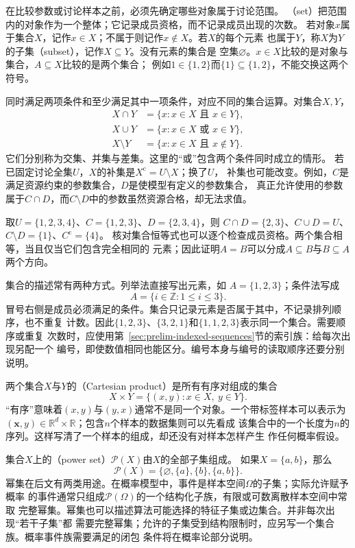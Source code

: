 在比较参数或讨论样本之前，必须先确定哪些对象属于讨论范围。
（set）把范围内的对象作为一个整体；它记录成员资格，而不记录成员出现的次数。
若对象$x$属于集合$X$，记作$x\in X$；不属于则记作$x\notin X$。若$X$的每个元素
也属于$Y$，称$X$为$Y$的子集（subset），记作$X\subseteq Y$。没有元素的集合是
空集$\varnothing$。$x\in X$比较的是对象与集合，$A\subseteq X$比较的是两个集合；
例如$1\in\{1,2\}$而$\{1\}\subseteq\{1,2\}$，不能交换这两个符号。

同时满足两项条件和至少满足其中一项条件，对应不同的集合运算。对集合$X,Y$，
\[
  \begin{aligned}
    X\cap Y&=\{x:x\in X\text{ 且 }x\in Y\},\\
    X\cup Y&=\{x:x\in X\text{ 或 }x\in Y\},\\
    X\setminus Y&=\{x:x\in X\text{ 且 }x\notin Y\}.
  \end{aligned}
\]
它们分别称为交集、并集与差集。这里的“或”包含两个条件同时成立的情形。
若已固定讨论全集$U$，$X$的补集是$X^{\mathrm c}=U\setminus X$；换了$U$，
补集也可能改变。例如，$C$是满足资源约束的参数集合，$D$是使模型有定义的参数集合，
真正允许使用的参数属于$C\cap D$，而$C\setminus D$中的参数虽然资源合格，却无法求值。

取$U=\{1,2,3,4\}$、$C=\{1,2,3\}$、$D=\{2,3,4\}$，则
$C\cap D=\{2,3\}$、$C\cup D=U$、$C\setminus D=\{1\}$、$C^{\mathrm c}=\{4\}$。
核对集合恒等式也可以逐个检查成员资格。两个集合相等，当且仅当它们包含完全相同的
元素；因此证明$A=B$可以分成$A\subseteq B$与$B\subseteq A$两个方向。

集合的描述常有两种方式。列举法直接写出元素，如
$A=\{1,2,3\}$；条件法写成
\[
  A=\{i\in\mathbb{Z}:1\leq i\leq 3\}.
\]
冒号右侧是成员必须满足的条件。集合只记录元素是否属于其中，不记录排列顺序，也不重复
计数。因此$\{1,2,3\}$、$\{3,2,1\}$和$\{1,1,2,3\}$表示同一个集合。需要顺序或重复
次数时，应使用第~\ref{sec:prelim-indexed-sequences}节的索引族：给每次出现另配一个
编号，即使数值相同也能区分。编号本身与编号的读取顺序还要分别说明。

两个集合$X$与$Y$的（Cartesian product）是所有有序对组成的集合
\[
  X\times Y=\{(x,y):x\in X,\ y\in Y\}.
\]
“有序”意味着$(x,y)$与$(y,x)$通常不是同一个对象。一个带标签样本可以表示为
$(\bm{x},y)\in\mathbb{R}^d\times\mathbb{R}$；包含$n$个样本的数据集则可以先看成
该集合中的一个长度为$n$的序列。这样写清了一个样本的组成，却还没有对样本怎样产生
作任何概率假设。

集合$X$上的（power set）$\mathcal{P}(X)$由$X$的全部子集组成。
如果$X=\{a,b\}$，那么
\[
  \mathcal{P}(X)=\{\varnothing,\{a\},\{b\},\{a,b\}\}.
\]
幂集在后文有两类用途。在概率模型中，事件是样本空间$\Omega$的子集；实际允许赋予概率
的事件通常只组成$\mathcal{P}(\Omega)$的一个结构化子族，有限或可数离散样本空间中常取
完整幂集。幂集也可以描述算法可能选择的特征子集或边集合。并非每次出现“若干子集”都
需要完整幂集；允许的子集受到结构限制时，应另写一个集合族。概率事件族需要满足的闭包
条件将在概率论部分说明。

